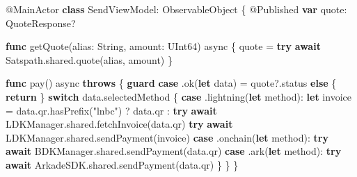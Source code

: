 \documentclass[
]{article}
\newenvironment{Shaded}{}{}
\newcommand{\AttributeTok}[1]{\textcolor[rgb]{0.49,0.56,0.16}{#1}}
\newcommand{\ControlFlowTok}[1]{\textcolor[rgb]{0.00,0.44,0.13}{\textbf{#1}}}
\newcommand{\DataTypeTok}[1]{\textcolor[rgb]{0.56,0.13,0.00}{#1}}
\newcommand{\FunctionTok}[1]{\textcolor[rgb]{0.02,0.16,0.49}{#1}}
\newcommand{\KeywordTok}[1]{\textcolor[rgb]{0.00,0.44,0.13}{\textbf{#1}}}
\newcommand{\NormalTok}[1]{#1}
\newcommand{\OperatorTok}[1]{\textcolor[rgb]{0.40,0.40,0.40}{#1}}
\newcommand{\StringTok}[1]{\textcolor[rgb]{0.25,0.44,0.63}{#1}}
\newcommand{\VariableTok}[1]{\textcolor[rgb]{0.10,0.09,0.49}{#1}}
\begin{document}
\begin{Shaded}
\begin{Highlighting}[]
\AttributeTok{@MainActor}
\KeywordTok{class}\NormalTok{ SendViewModel}\OperatorTok{:} \DataTypeTok{ObservableObject} \OperatorTok{\{}
    \AttributeTok{@Published} \KeywordTok{var} \VariableTok{quote}\OperatorTok{:}\NormalTok{ QuoteResponse}\OperatorTok{?}

    \KeywordTok{func} \FunctionTok{getQuote}\OperatorTok{(}\VariableTok{alias}\OperatorTok{:} \DataTypeTok{String}\OperatorTok{,} \VariableTok{amount}\OperatorTok{:} \DataTypeTok{UInt64}\OperatorTok{)} \FunctionTok{async} \OperatorTok{\{}
\NormalTok{        quote }\OperatorTok{=} \ControlFlowTok{try} \ControlFlowTok{await}\NormalTok{ Satspath}\OperatorTok{.}\NormalTok{shared}\OperatorTok{.}\NormalTok{quote}\OperatorTok{(}\NormalTok{alias}\OperatorTok{,}\NormalTok{ amount}\OperatorTok{)}
    \OperatorTok{\}}

    \KeywordTok{func} \FunctionTok{pay}\OperatorTok{()} \FunctionTok{async} \KeywordTok{throws} \OperatorTok{\{}
        \ControlFlowTok{guard} \ControlFlowTok{case} \OperatorTok{.}\NormalTok{ok}\OperatorTok{(}\KeywordTok{let} \VariableTok{data}\OperatorTok{)} \OperatorTok{=}\NormalTok{ quote}\OperatorTok{?.}\NormalTok{status }\ControlFlowTok{else} \OperatorTok{\{} \KeywordTok{return} \OperatorTok{\}}
        \ControlFlowTok{switch}\NormalTok{ data}\OperatorTok{.}\NormalTok{selectedMethod }\OperatorTok{\{}
        \ControlFlowTok{case} \OperatorTok{.}\NormalTok{lightning}\OperatorTok{(}\KeywordTok{let} \VariableTok{method}\OperatorTok{):}
            \KeywordTok{let} \VariableTok{invoice} \OperatorTok{=}\NormalTok{ data}\OperatorTok{.}\NormalTok{qr}\OperatorTok{.}\NormalTok{hasPrefix}\OperatorTok{(}\StringTok{"lnbc"}\OperatorTok{)} \OperatorTok{?}\NormalTok{ data}\OperatorTok{.}\NormalTok{qr }\OperatorTok{:} \ControlFlowTok{try} \ControlFlowTok{await}\NormalTok{ LDKManager}\OperatorTok{.}\NormalTok{shared}\OperatorTok{.}\NormalTok{fetchInvoice}\OperatorTok{(}\NormalTok{data}\OperatorTok{.}\NormalTok{qr}\OperatorTok{)}
            \ControlFlowTok{try} \ControlFlowTok{await}\NormalTok{ LDKManager}\OperatorTok{.}\NormalTok{shared}\OperatorTok{.}\NormalTok{sendPayment}\OperatorTok{(}\NormalTok{invoice}\OperatorTok{)}
        \ControlFlowTok{case} \OperatorTok{.}\NormalTok{onchain}\OperatorTok{(}\KeywordTok{let} \VariableTok{method}\OperatorTok{):}
            \ControlFlowTok{try} \ControlFlowTok{await}\NormalTok{ BDKManager}\OperatorTok{.}\NormalTok{shared}\OperatorTok{.}\NormalTok{sendPayment}\OperatorTok{(}\NormalTok{data}\OperatorTok{.}\NormalTok{qr}\OperatorTok{)}
        \ControlFlowTok{case} \OperatorTok{.}\NormalTok{ark}\OperatorTok{(}\KeywordTok{let} \VariableTok{method}\OperatorTok{):}
            \ControlFlowTok{try} \ControlFlowTok{await}\NormalTok{ ArkadeSDK}\OperatorTok{.}\NormalTok{shared}\OperatorTok{.}\NormalTok{sendPayment}\OperatorTok{(}\NormalTok{data}\OperatorTok{.}\NormalTok{qr}\OperatorTok{)}
        \OperatorTok{\}}
    \OperatorTok{\}}
\OperatorTok{\}}
\end{Highlighting}
\end{Shaded}
\end{document}
